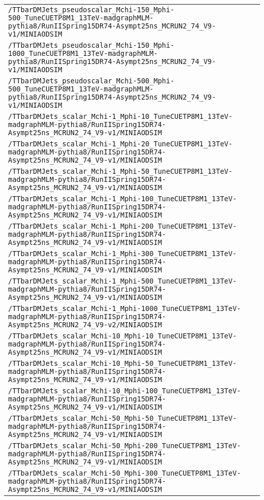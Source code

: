 \begin{center}
\begin{tabular}{l}
\verb!/TTbarDMJets_pseudoscalar_Mchi-150_Mphi-500_TuneCUETP8M1_13TeV-madgraphMLM-pythia8/RunIISpring15DR74-Asympt25ns_MCRUN2_74_V9-v1/MINIAODSIM! \tabularnewline
\verb!/TTbarDMJets_pseudoscalar_Mchi-150_Mphi-1000_TuneCUETP8M1_13TeV-madgraphMLM-pythia8/RunIISpring15DR74-Asympt25ns_MCRUN2_74_V9-v1/MINIAODSIM! \tabularnewline
\verb!/TTbarDMJets_pseudoscalar_Mchi-500_Mphi-500_TuneCUETP8M1_13TeV-madgraphMLM-pythia8/RunIISpring15DR74-Asympt25ns_MCRUN2_74_V9-v1/MINIAODSIM! \tabularnewline
\verb!/TTbarDMJets_scalar_Mchi-1_Mphi-10_TuneCUETP8M1_13TeV-madgraphMLM-pythia8/RunIISpring15DR74-Asympt25ns_MCRUN2_74_V9-v1/MINIAODSIM! \tabularnewline
\verb!/TTbarDMJets_scalar_Mchi-1_Mphi-20_TuneCUETP8M1_13TeV-madgraphMLM-pythia8/RunIISpring15DR74-Asympt25ns_MCRUN2_74_V9-v1/MINIAODSIM! \tabularnewline
\verb!/TTbarDMJets_scalar_Mchi-1_Mphi-50_TuneCUETP8M1_13TeV-madgraphMLM-pythia8/RunIISpring15DR74-Asympt25ns_MCRUN2_74_V9-v1/MINIAODSIM! \tabularnewline
\verb!/TTbarDMJets_scalar_Mchi-1_Mphi-100_TuneCUETP8M1_13TeV-madgraphMLM-pythia8/RunIISpring15DR74-Asympt25ns_MCRUN2_74_V9-v1/MINIAODSIM! \tabularnewline
\verb!/TTbarDMJets_scalar_Mchi-1_Mphi-200_TuneCUETP8M1_13TeV-madgraphMLM-pythia8/RunIISpring15DR74-Asympt25ns_MCRUN2_74_V9-v1/MINIAODSIM! \tabularnewline
\verb!/TTbarDMJets_scalar_Mchi-1_Mphi-300_TuneCUETP8M1_13TeV-madgraphMLM-pythia8/RunIISpring15DR74-Asympt25ns_MCRUN2_74_V9-v1/MINIAODSIM! \tabularnewline
\verb!/TTbarDMJets_scalar_Mchi-1_Mphi-500_TuneCUETP8M1_13TeV-madgraphMLM-pythia8/RunIISpring15DR74-Asympt25ns_MCRUN2_74_V9-v1/MINIAODSIM! \tabularnewline
\verb!/TTbarDMJets_scalar_Mchi-1_Mphi-1000_TuneCUETP8M1_13TeV-madgraphMLM-pythia8/RunIISpring15DR74-Asympt25ns_MCRUN2_74_V9-v2/MINIAODSIM! \tabularnewline
\verb!/TTbarDMJets_scalar_Mchi-10_Mphi-10_TuneCUETP8M1_13TeV-madgraphMLM-pythia8/RunIISpring15DR74-Asympt25ns_MCRUN2_74_V9-v1/MINIAODSIM! \tabularnewline
\verb!/TTbarDMJets_scalar_Mchi-10_Mphi-50_TuneCUETP8M1_13TeV-madgraphMLM-pythia8/RunIISpring15DR74-Asympt25ns_MCRUN2_74_V9-v1/MINIAODSIM! \tabularnewline
\verb!/TTbarDMJets_scalar_Mchi-10_Mphi-100_TuneCUETP8M1_13TeV-madgraphMLM-pythia8/RunIISpring15DR74-Asympt25ns_MCRUN2_74_V9-v1/MINIAODSIM! \tabularnewline
\verb!/TTbarDMJets_scalar_Mchi-50_Mphi-50_TuneCUETP8M1_13TeV-madgraphMLM-pythia8/RunIISpring15DR74-Asympt25ns_MCRUN2_74_V9-v1/MINIAODSIM! \tabularnewline
\verb!/TTbarDMJets_scalar_Mchi-50_Mphi-200_TuneCUETP8M1_13TeV-madgraphMLM-pythia8/RunIISpring15DR74-Asympt25ns_MCRUN2_74_V9-v1/MINIAODSIM! \tabularnewline
\verb!/TTbarDMJets_scalar_Mchi-50_Mphi-300_TuneCUETP8M1_13TeV-madgraphMLM-pythia8/RunIISpring15DR74-Asympt25ns_MCRUN2_74_V9-v1/MINIAODSIM! \tabularnewline

\end{tabular}
\end{center}
